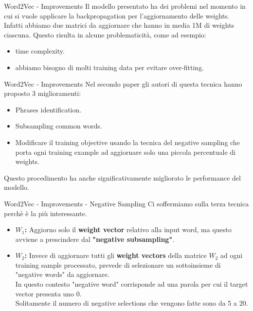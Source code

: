 \documentclass[british]{beamer}
\begin{document}
\begin{frame}{Word2Vec - Improvements}
	Il modello presentato ha dei problemi nel momento in cui si vuole applicare la backpropagation per l'aggiornamento delle weights.
	Infatti abbiamo due matrici da aggiornare che hanno in media 1M di weights ciascuna.
	Questo risulta in alcune problematicit\`{a}, come ad esempio:
	\begin{itemize}
		\item time complexity.
		\item abbiamo bisogno di molti training data per evitare over-fitting.
	\end{itemize}
\end{frame}
\begin{frame}{Word2Vec - Improvements}
	Nel secondo paper gli autori di questa tecnica hanno proposto 3 miglioramenti:
	\begin{itemize}
		\item Phrases identification.
		\item Subsampling common words.
		\item Modificare il training objective usando la tecnica del negative sampling che porta ogni training example ad aggiornare solo una piccola percentuale di weights.
	\end{itemize}
	Questo procedimento ha anche significativamente migliorato le performance del modello.
\end{frame}

\begin{frame}{Word2Vec - Improvements - Negative Sampling}
	Ci soffermiamo sulla terza tecnica perch\`{e} \`{e} la pi\`{u} interessante.\\
	\begin{itemize}
		\item \textbf{\(W_1\): }Aggiorno solo il \textbf{weight vector} relativo alla input word, ma questo avviene a prescindere dal \textbf{"negative subsampling"}.
		\item \textbf{\(W_2\): }Invece di aggiornare tutti gli \textbf{weight vectors} della matrice \(W_2\) ad ogni training sample processato, prevede di selezionare un sottoinsieme di "negative words" da aggiornare.\\
		In questo contesto "negative word" corrisponde ad una parola per cui il target vector presenta uno 0.\\
		Solitamente il numero di negative selections che vengono fatte sono da 5 a 20.
	\end{itemize}
\end{frame}
\end{document}
